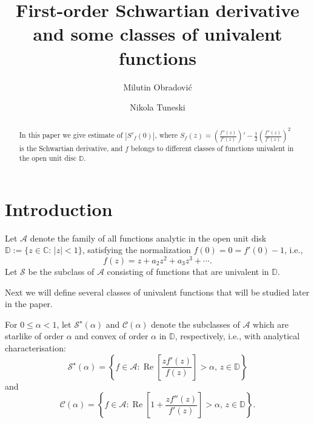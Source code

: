 \documentclass{amsart}
\newcommand{\IC}{{\mathbb C}}
\newcommand{\ID}{{\mathbb D}}
\begin{document}
\title[First-order Schwartian derivative and some classes]{First-order Schwartian derivative and some classes of univalent functions }

\author[M. Obradovi\'{c}]{Milutin Obradovi\'{c}}
\address{Department of Mathematics,
Faculty of Civil Engineering, University of Belgrade,
Bulevar Kralja Aleksandra 73, 11000, Belgrade, Serbia}

\author[N. Tuneski]{Nikola Tuneski}
\address{Department of Mathematics and Informatics, Faculty of Mechanical Engineering, Ss. Cyril and Methodius,
University in Skopje, Karpo\v{s} II b.b., 1000 Skopje, Republic of North Macedonia.}




\maketitle

\begin{abstract}
In this paper we give estimate of $|S'_{f}(0)|$, where
$S_{f}(z)= \left(\frac{f''(z)}{f'(z)}\right)'-\frac{1}{2}\left(\frac{f''(z)}{f'(z)}\right)^{2}$ is the Schwartian derivative, and $f$ belongs to different classes of functions univalent in the open unit disc $\ID$.
\end{abstract}



\section{Introduction}

Let ${\mathcal A}$ denote the family of all functions analytic in the open unit disk $\ID := \{ z\in \IC:\, |z| < 1 \}$,  satisfying the normalization $f(0)=0= f'(0)-1$, i.e.,
\begin{equation}\label{eq-1}
f(z)=z+a_2z^2+a_3z^3+\cdots.
\end{equation}
Let $\mathcal{S}$ be the subclass of $\mathcal{A}$ consisting of functions that are univalent in $\ID$.

\medskip

Next we will define several classes of univalent functions that will be studied later in the paper.

\medskip

For $0\leq \alpha<1$, let $\mathcal{S}^{\star}(\alpha)$ and $\mathcal{C}(\alpha)$ denote the subclasses of
${\mathcal A}$ which are starlike of order $\alpha$ and convex of order $\alpha$ in $\ID$, respectively, i.e., with analytical characterisation:
\[ \mathcal{S}^{\star}(\alpha) = \left\{ f\in\mathcal{A}: \operatorname{Re}\left[\frac{zf'(z)}{f(z)}\right] >\alpha,\, z\in\ID \right\} \]
and
\[ \mathcal{C}(\alpha) = \left\{ f\in\mathcal{A}: \operatorname{Re}\left[1+\frac{zf''(z)}{f'(z)}\right] >\alpha,\, z\in\ID \right\}.\]
\end{document}
